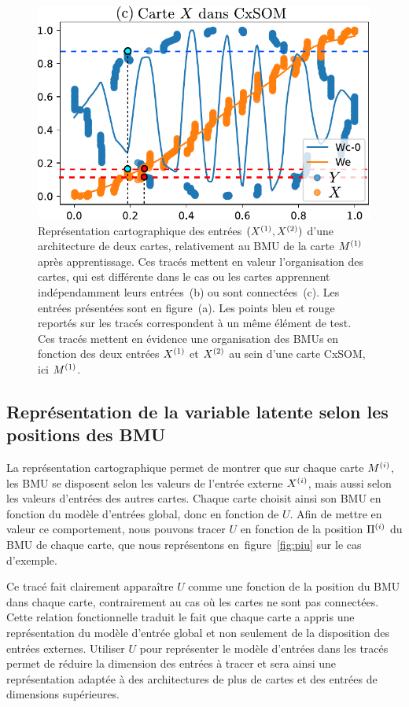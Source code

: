 \documentclass[../main]{subfiles}
\begin{document}
\begin{figure}
\begin{minipage}{0.38\textwidth}
\includegraphics[width=\textwidth]{weights_2som.pdf}
\end{minipage}

\caption{Représentation cartographique des entrées $(X^{({1})},X^{({2})})$ d'une architecture de deux cartes, relativement au BMU de la carte $M^{({1})}$ après apprentissage. 
Ces tracés mettent en valeur l'organisation des cartes, qui est différente dans le cas ou les cartes apprennent indépendamment leurs entrées~(b) ou sont connectées~(c). Les entrées présentées sont en figure~(a). Les points bleu et rouge reportés sur les tracés correspondent à un même élément de test. Ces tracés mettent en évidence une organisation des BMUs en fonction des deux entrées $X^{({1})}$ et $X^{({2})}$ au sein d'une carte CxSOM, ici $M^{({1})}$. \label{fig:inputs}}
\end{figure}

\subsection{Représentation de la variable latente selon les positions des BMU}\label{sec:u_bmu}

La représentation cartographique permet de montrer que sur chaque carte $M^{({i})}$, les BMU se disposent selon les valeurs de l'entrée externe $X^{({i})}$, mais aussi selon les valeurs d'entrées des autres cartes. 
Chaque carte choisit ainsi son BMU en fonction du modèle d'entrées global, donc en fonction de $U$.
Afin de mettre en valeur ce comportement, nous pouvons tracer $U$ en fonction de la position $\Pi^{({i})}$ du BMU de chaque carte, que nous représentons en~figure~\ref{fig:piu} sur le cas d'exemple.

Ce tracé fait clairement apparaître $U$ comme une fonction de la position du BMU dans chaque carte, contrairement au cas où les cartes ne sont pas connectées. 
Cette relation fonctionnelle traduit le fait que chaque carte a appris une représentation du modèle d'entrée global et non seulement de la disposition des entrées externes.
Utiliser $U$ pour représenter le modèle d'entrées dans les tracés permet de réduire la dimension des entrées à tracer et sera ainsi une représentation adaptée à des architectures de plus de cartes et des entrées de dimensions supérieures.
\end{document}
